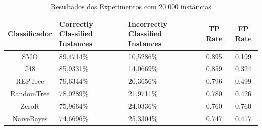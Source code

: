 \documentclass[
	12pt,				%
	openright,			%
	oneside,	
	a4paper,				%
	english,				%
	brazil				%
]{abntex2/abntex2} %
\begin{document}
\begin{table}[htbp]
	\centering
	\caption{Resultados dos Experimentos com 20.000 instâncias}
	\label{tabResultadosExperimentos20k}
	\begin{center}
		\renewcommand{\arraystretch}{2}
		\begin{tabular}{cp{3cm}p{3.2cm}cc}
			\hline
			\textbf{Classificador}                & \textbf{Correctly Classified Instances}               & \textbf{Incorrectly Classified Instances}      	& \textbf{TP Rate}						&\textbf{FP Rate}   \\ \hline
			SMO                                      & 89,4714\%                                                                                 & 10,5286\% 							&0.895									&0.199                                                                                    \\
			J48                                      & 85,9331\%                                                                                  & 14,0669\% 							&0.859										&0.324                                                                                     \\
			REPTree                                  & 79,6344\%                                                                                 & 20,3656\%								&0.796											&0.499                                                                                     \\ 
			RandomTree                               & 78,0289\%                                                                                 & 21,9711\%								&0.780												&0.426                                                                                     \\ \hline \hline
			ZeroR    									& 75,9664\%                                                 									& 24,0336\%								&0.760											&0.760                                                     								\\ 
			NaiveBayes                               & 74,6696\%                                                                                 &  25,3304\%									&0.747												&0.417                                                                                     \\ \hline
		\end{tabular}
	\end{center}
\end{table}
\end{document}
